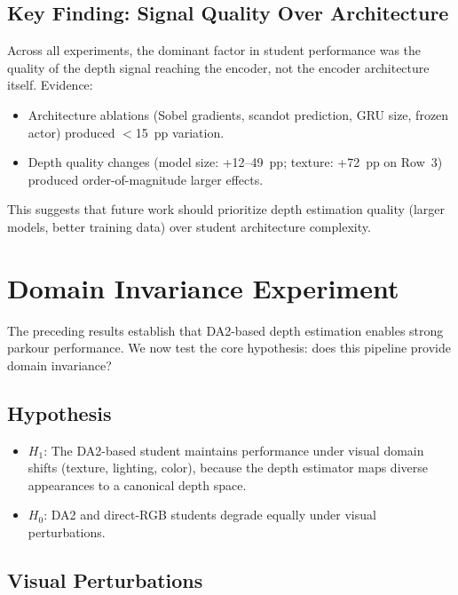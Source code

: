 \documentclass[10pt,twocolumn]{article}
\begin{document}
\subsection{Key Finding: Signal Quality Over Architecture}

Across all experiments, the dominant factor in student performance
was the quality of the depth signal reaching the encoder, not the
encoder architecture itself.  Evidence:
\begin{itemize}
  \item Architecture ablations (Sobel gradients, scandot prediction,
    GRU size, frozen actor) produced $<$15~pp variation.
  \item Depth quality changes (model size: +12--49~pp; texture:
    +72~pp on Row~3) produced order-of-magnitude larger effects.
\end{itemize}
This suggests that future work should prioritize depth estimation
quality (larger models, better training data) over student
architecture complexity.


\section{Domain Invariance Experiment}
\label{sec:domain}

The preceding results establish that DA2-based depth estimation
enables strong parkour performance.  We now test the core hypothesis:
does this pipeline provide domain invariance?

\subsection{Hypothesis}

\begin{itemize}
  \item $H_1$: The DA2-based student maintains performance under
    visual domain shifts (texture, lighting, color), because the depth
    estimator maps diverse appearances to a canonical depth space.
  \item $H_0$: DA2 and direct-RGB students degrade equally under
    visual perturbations.
\end{itemize}

\subsection{Visual Perturbations}
\end{document}
